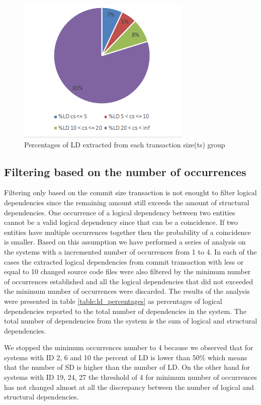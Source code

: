 \documentclass[conference]{IEEEtran}
\begin{document}
\begin{figure}[h]
\includegraphics[scale=0.9]{fig_ld_ts.png}
\caption{Percentages of LD extracted from each transaction size(ts) group}
\label{fig:fig_ld_ts}
\centering
\end{figure}


\subsection{Filtering based on the number of occurrences}
\label{sec:filterocc}
Filtering only based on the commit size transaction is not enought to filter logical dependencies since the remaining amount still exceeds the amount of structural dependencies.
One occurrence of a logical dependency between two entities cannot be a valid logical dependency since that can be a coincidence. If two entities have multiple occurrences together then the probability of a coincidence is smaller.
Based on this assumption we have performed a series of analysis on the systems with a incremented number of occurrences from 1 to 4. In each of the cases the extracted logical dependencies from commit transaction with less or equal to 10 changed source code files were also filtered by the minimum number of occurrences established and all the logical dependencies that did not exceeded the minimum number of occurrences were discarded. 
The results of the analysis were presented in table \ref{table:ld_percentages} as percentages of logical dependencies reported to the total number of dependencies in the system. The total number of dependencies from the system is the sum of logical and structural dependencies.

We stopped the minimum occurrences number to 4 because we observed that for systems with ID 2, 6 and 10 the percent of LD is lower than 50\% which means that the number of SD is higher than the number of LD. On the other hand for systems with
ID 19, 24, 27 the threshold of 4 for minimum number of occurrences has not changed almost at all the discrepancy between the number of logical and structural dependencies.
\end{document}
